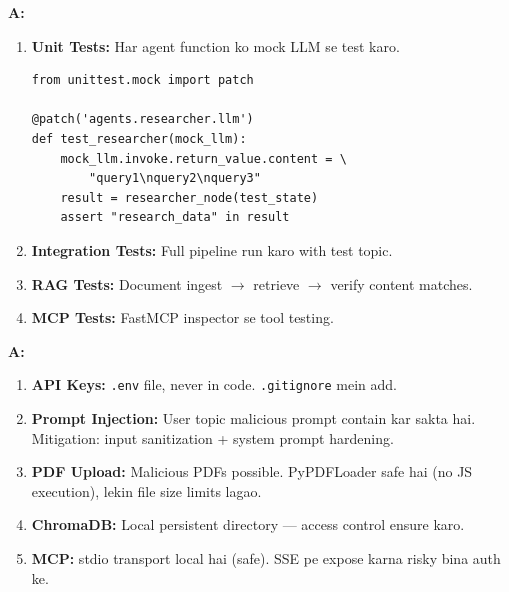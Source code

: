 \documentclass[12pt, a4paper]{article}
\begin{document}
\begin{interviewbox}[title={\faIcon{user-tie} ~Q42: Testing strategy kya hogi?}]
\textbf{A:}
\begin{enumerate}
\item \textbf{Unit Tests:} Har agent function ko mock LLM se test karo.
\begin{lstlisting}[style=pythonstyle]
from unittest.mock import patch

@patch('agents.researcher.llm')
def test_researcher(mock_llm):
    mock_llm.invoke.return_value.content = \
        "query1\nquery2\nquery3"
    result = researcher_node(test_state)
    assert "research_data" in result
\end{lstlisting}

\item \textbf{Integration Tests:} Full pipeline run karo with test topic.
\item \textbf{RAG Tests:} Document ingest $\rightarrow$ retrieve $\rightarrow$ verify content matches.
\item \textbf{MCP Tests:} FastMCP inspector se tool testing.
\end{enumerate}
\end{interviewbox}

\begin{interviewbox}[title={\faIcon{user-tie} ~Q43: Security considerations kya hain?}]
\textbf{A:}
\begin{enumerate}
\item \textbf{API Keys:} \texttt{.env} file, never in code. \texttt{.gitignore} mein add.
\item \textbf{Prompt Injection:} User topic malicious prompt contain kar sakta hai. Mitigation: input sanitization + system prompt hardening.
\item \textbf{PDF Upload:} Malicious PDFs possible. PyPDFLoader safe hai (no JS execution), lekin file size limits lagao.
\item \textbf{ChromaDB:} Local persistent directory --- access control ensure karo.
\item \textbf{MCP:} stdio transport local hai (safe). SSE pe expose karna risky bina auth ke.
\end{enumerate}
\end{interviewbox}
\end{document}

